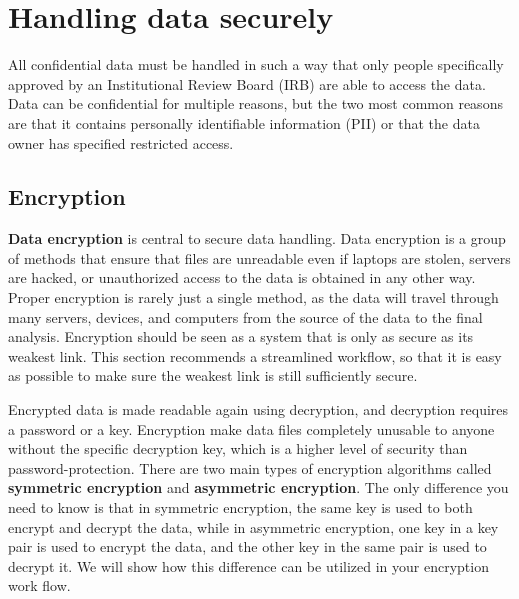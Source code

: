 \section{Handling data securely}

All confidential data must be handled in such a way that only people specifically 
approved by an Institutional Review Board (IRB)
are able to access the data.
Data can be confidential for multiple reasons, but the two most
common reasons are that it contains personally identifiable information (PII)
or that the data owner has specified restricted access.


\subsection{Encryption}

\textbf{Data encryption} is central to secure data handling. 
Data encryption is a group of methods that ensure that files are unreadable 
even if laptops are stolen, servers are hacked, 
or unauthorized access to the data is obtained in any other way.
Proper encryption is rarely just a single method,
as the data will travel through many servers, devices, and computers
from the source of the data to the final analysis.
Encryption should be seen as a system that is only as secure as its weakest link.
This section recommends a streamlined workflow,
so that it is easy as possible to make sure the weakest link is still sufficiently secure.

Encrypted data is made readable again using decryption,
and decryption requires a password or a key.
Encryption make data files completely unusable to anyone without the specific decryption key, 
which is a higher level of security than password-protection.
There are two main types of encryption algorithms called
\textbf{symmetric encryption}
and \textbf{asymmetric encryption}.
The only difference you need to know is that in symmetric encryption,
the same key is used to both encrypt and decrypt the data,
while in asymmetric encryption, 
one key in a key pair is used to encrypt the data, 
and the other key in the same pair is used to decrypt it.
We will show how this difference can be utilized in your encryption work flow.

